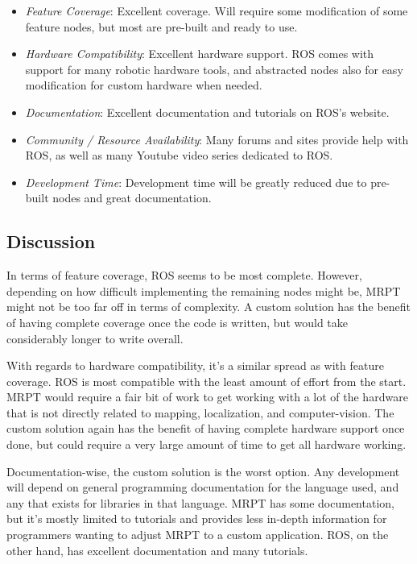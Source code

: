 \documentclass[onecolumn, draftclsnofoot, 10pt, compsoc]{IEEEtran}
\begin{document}
\begin{itemize}
\item \textit{Feature Coverage}: Excellent coverage.
Will require some modification of some feature nodes, but most are pre-built and ready to use.
\item \textit{Hardware Compatibility}: Excellent hardware support.
ROS comes with support for many robotic hardware tools, and abstracted nodes also for easy modification for custom hardware when needed.
\item \textit{Documentation}: Excellent documentation and tutorials on ROS's website.
\item \textit{Community / Resource Availability}: Many forums and sites provide help with ROS, as well as many Youtube video series dedicated to ROS.
\item \textit{Development Time}: Development time will be greatly reduced due to pre-built nodes and great documentation.
\end{itemize}

\subsection{Discussion}
In terms of feature coverage, ROS seems to be most complete. However, depending on how difficult implementing the remaining nodes might be, MRPT might not be too far off in terms of complexity. A custom solution has the benefit of having complete coverage once the code is written, but would take considerably longer to write overall.

With regards to hardware compatibility, it's a similar spread as with feature coverage. ROS is most compatible with the least amount of effort from the start. MRPT would require a fair bit of work to get working with a lot of the hardware that is not directly related to mapping, localization, and computer-vision. The custom solution again has the benefit of having complete hardware support once done, but could require a very large amount of time to get all hardware working.

Documentation-wise, the custom solution is the worst option. Any development will depend on general programming documentation for the language used, and any that exists for libraries in that language. MRPT has some documentation, but it's mostly limited to tutorials and provides less in-depth information for programmers wanting to adjust MRPT to a custom application. ROS, on the other hand, has excellent documentation and many tutorials.
\end{document}
